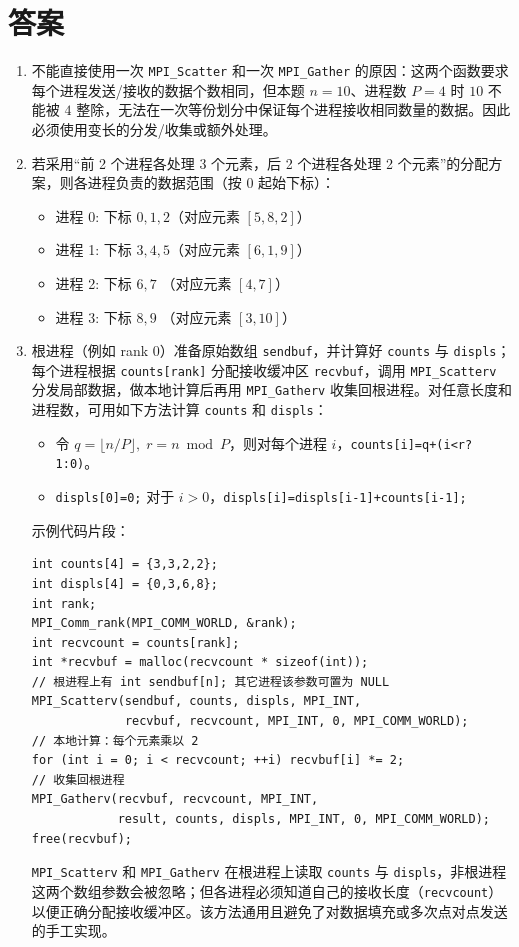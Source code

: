 \section{答案}
\begin{enumerate}
    \item 不能直接使用一次 \texttt{MPI\_Scatter} 和一次 \texttt{MPI\_Gather} 的原因：这两个函数要求每个进程发送/接收的数据个数相同，但本题 $n=10$、进程数 $P=4$ 时 $10$ 不能被 $4$ 整除，无法在一次等份划分中保证每个进程接收相同数量的数据。因此必须使用变长的分发/收集或额外处理。

    \item 若采用“前 2 个进程各处理 3 个元素，后 2 个进程各处理 2 个元素”的分配方案，则各进程负责的数据范围（按 0 起始下标）：
    \begin{itemize}
        \item 进程 0: 下标 $0,1,2$（对应元素 $[5,8,2]$）
        \item 进程 1: 下标 $3,4,5$（对应元素 $[6,1,9]$）
        \item 进程 2: 下标 $6,7$  （对应元素 $[4,7]$）
        \item 进程 3: 下标 $8,9$  （对应元素 $[3,10]$）
    \end{itemize}

    \item 根进程（例如 rank 0）准备原始数组 \texttt{sendbuf}，并计算好 \texttt{counts} 与 \texttt{displs}；每个进程根据 \texttt{counts[rank]} 分配接收缓冲区 \texttt{recvbuf}，调用 \texttt{MPI\_Scatterv} 分发局部数据，做本地计算后再用 \texttt{MPI\_Gatherv} 收集回根进程。对任意长度和进程数，可用如下方法计算 \texttt{counts} 和 \texttt{displs}：
    \begin{itemize}
        \item 令 $q=\lfloor n/P\rfloor,\; r=n\bmod P$，则对每个进程 $i$，\texttt{counts[i]=q+(i<r?1:0)}。
        \item \texttt{displs[0]=0;} 对于 $i>0$，\texttt{displs[i]=displs[i-1]+counts[i-1];}
    \end{itemize}

    示例代码片段：
    \begin{lstlisting}[style=cleancpp]
int counts[4] = {3,3,2,2};
int displs[4] = {0,3,6,8};
int rank;
MPI_Comm_rank(MPI_COMM_WORLD, &rank);
int recvcount = counts[rank];
int *recvbuf = malloc(recvcount * sizeof(int));
// 根进程上有 int sendbuf[n]; 其它进程该参数可置为 NULL 
MPI_Scatterv(sendbuf, counts, displs, MPI_INT,
             recvbuf, recvcount, MPI_INT, 0, MPI_COMM_WORLD);
// 本地计算：每个元素乘以 2 
for (int i = 0; i < recvcount; ++i) recvbuf[i] *= 2;
// 收集回根进程 
MPI_Gatherv(recvbuf, recvcount, MPI_INT,
            result, counts, displs, MPI_INT, 0, MPI_COMM_WORLD);
free(recvbuf);
    \end{lstlisting}
\texttt{MPI\_Scatterv} 和 \texttt{MPI\_Gatherv} 在根进程上读取 \texttt{counts} 与 \texttt{displs}，非根进程这两个数组参数会被忽略；但各进程必须知道自己的接收长度（\texttt{recvcount}）以便正确分配接收缓冲区。该方法通用且避免了对数据填充或多次点对点发送的手工实现。
\end{enumerate}

